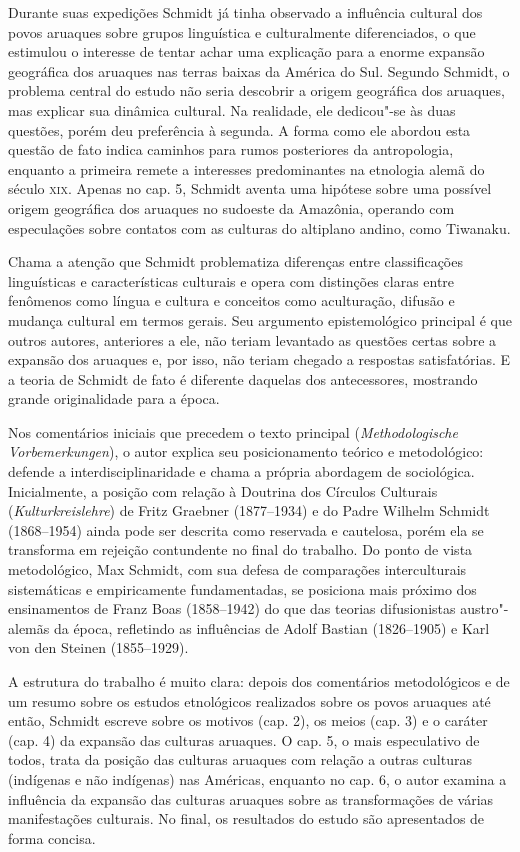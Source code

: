 Durante suas expedições Schmidt já tinha observado a influência cultural
dos povos aruaques sobre grupos linguística e culturalmente
diferenciados, o que estimulou o interesse de tentar achar uma
explicação para a enorme expansão geográfica dos aruaques nas terras
baixas da América do Sul. Segundo Schmidt, o problema central do estudo
não seria descobrir a origem geográfica dos aruaques, mas explicar sua
dinâmica cultural. Na realidade, ele dedicou"-se às duas questões, porém
deu preferência à segunda. A forma como ele abordou esta questão de fato
indica caminhos para rumos posteriores da antropologia, enquanto a
primeira remete a interesses predominantes na etnologia alemã do século
\textsc{xix}. Apenas no cap. 5, Schmidt aventa uma hipótese sobre uma possível
origem geográfica dos aruaques no sudoeste da Amazônia, operando com
especulações sobre contatos com as culturas do altiplano andino, como
Tiwanaku.

Chama a atenção que Schmidt problematiza diferenças entre classificações
linguísticas e características culturais e opera com distinções claras
entre fenômenos como língua e cultura e conceitos como aculturação,
difusão e mudança cultural em termos gerais. Seu argumento
epistemológico principal é que outros autores, anteriores a ele, não
teriam levantado as questões certas sobre a expansão dos aruaques e, por
isso, não teriam chegado a respostas satisfatórias. E a teoria de
Schmidt de fato é diferente daquelas dos antecessores, mostrando grande
originalidade para a época.

Nos comentários iniciais que precedem o texto principal
(\emph{Methodologische Vorbemerkungen}), o autor explica seu
posicionamento teórico e metodológico: defende a interdisciplinaridade
e chama a própria abordagem de sociológica. Inicialmente, a posição com
relação à Doutrina dos Círculos Culturais (\emph{Kulturkreislehre}) de
Fritz Graebner (1877--1934) e do Padre Wilhelm Schmidt (1868--1954) ainda
pode ser descrita como reservada e cautelosa, porém ela se transforma em
rejeição contundente no final do trabalho. Do ponto de vista
metodológico, Max Schmidt, com sua defesa de comparações interculturais
sistemáticas e empiricamente fundamentadas, se posiciona mais próximo
dos ensinamentos de Franz Boas (1858--1942) do que das teorias
difusionistas austro"-alemãs da época, refletindo as influências de
Adolf Bastian (1826--1905) e Karl von den Steinen (1855--1929).

A estrutura do trabalho é muito clara: depois dos comentários
metodológicos e de um resumo sobre os estudos etnológicos realizados
sobre os povos aruaques até então, Schmidt escreve sobre os motivos
(cap. 2), os meios (cap. 3) e o caráter (cap. 4) da expansão das
culturas aruaques. O cap. 5, o mais especulativo de todos, trata da
posição das culturas aruaques com relação a outras culturas (indígenas
e não indígenas) nas Américas, enquanto no cap. 6, o autor examina a
influência da expansão das culturas aruaques sobre as transformações de
várias manifestações culturais. No final, os resultados do estudo são
apresentados de forma concisa.

